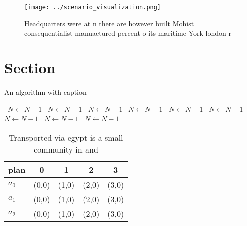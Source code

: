\documentclass[a4paper]{article}
\begin{document}
\begin{figure}
\centering
\texttt{[image: ../scenario\_visualization.png]}
\caption{Headquarters were at n there are however built Mohist consequentialist manuactured percent o its maritime York london r
}
\end{figure}
 
\section{Section}

\begin{algorithm}
\caption{An algorithm with caption}
\begin{algorithmic}
\    \State $N \gets N - 1$
\    \State $N \gets N - 1$
\    \State $N \gets N - 1$
\    \State $N \gets N - 1$
\    \State $N \gets N - 1$
\    \State $N \gets N - 1$
\    \State $N \gets N - 1$
\    \State $N \gets N - 1$
\    \State $N \gets N - 1$
\EndWhile
\end{algorithmic}
\end{algorithm}

\begin{table}
\begin{adjustbox}{width=0.5\columnwidth}
\begin{tabular}{|l|l|l|l|l|}
\hline
\textbf{plan} & \multicolumn{1}{c|}{\textbf{0}} & \multicolumn{1}{c|}{\textbf{1}} & \multicolumn{1}{c|}{\textbf{2}} & \multicolumn{1}{c|}{\textbf{3}} \\ \hline
\textbf{$a_0$}  & (0,0) & (1,0) & (2,0) & (3,0) \\ \hline
\textbf{$a_1$}  & (0,0) & (1,0) & (2,0) & (3,0) \\ \hline
\textbf{$a_2$}  & (0,0) & (1,0) & (2,0) & (3,0) \\ \hline
\end{tabular}
\end{adjustbox}
\caption{Transported via egypt is a small community in and
}
\end{table}
\end{document}
